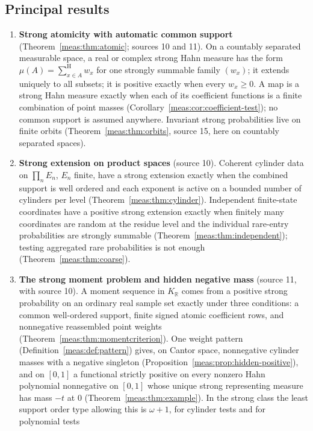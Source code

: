 \documentclass[11pt]{article}
\numberwithin{equation}{section}
\theoremstyle{definition}
\theoremstyle{remark}
\newcommand{\R}{\mathbb R}
\newcommand{\KR}{K_{\R}}
\newcommand{\hsum}{\mathop{\sum}\nolimits^{\mathrm H}}
\begin{document}
\subsection{Principal results}\label{meas:sub:results}

\begin{enumerate}[label=\textbf{\Alph*.},leftmargin=2em]
\item \textbf{Strong atomicity with automatic common support}
(Theorem~\ref{meas:thm:atomic}; sources 10 and 11). On a countably separated
measurable space, a real or complex strong Hahn measure has the form
$\mu(A)=\hsum_{x\in A}w_x$ for one strongly summable family $(w_x)$; it extends
uniquely to all subsets; it is positive exactly when every $w_x\ge0$. A map is a
strong Hahn measure exactly when each of its coefficient functions is a finite
combination of point masses (Corollary~\ref{meas:cor:coefficient-test}); no
common support is assumed anywhere. Invariant strong probabilities live on
finite orbits (Theorem~\ref{meas:thm:orbits}, source 15, here on countably
separated spaces).
\item \textbf{Strong extension on product spaces} (source 10). Coherent
cylinder data on $\prod_nE_n$, $E_n$ finite, have a strong extension exactly
when the combined support is well ordered and each exponent is active on a
bounded number of cylinders per level (Theorem~\ref{meas:thm:cylinder}).
Independent finite-state coordinates have a positive strong extension exactly
when finitely many coordinates are random at the residue level and the
individual rare-entry probabilities are strongly summable
(Theorem~\ref{meas:thm:independent}); testing aggregated rare probabilities is
not enough (Theorem~\ref{meas:thm:coarse}).
\item \textbf{The strong moment problem and hidden negative mass} (source 11,
with source 10). A moment sequence in $\KR$ comes from a positive strong
probability on an ordinary real sample set exactly under three conditions:
a common well-ordered support, finite signed atomic coefficient rows, and
nonnegative reassembled point weights (Theorem~\ref{meas:thm:momentcriterion}).
One weight pattern (Definition~\ref{meas:def:pattern}) gives, on Cantor space,
nonnegative cylinder masses with a negative singleton
(Proposition~\ref{meas:prop:hidden-positive}), and on $[0,1]$ a functional
strictly positive on every nonzero Hahn polynomial nonnegative on $[0,1]$
whose unique strong representing measure has mass $-t$ at $0$
(Theorem~\ref{meas:thm:example}). In the strong class the least support order
type allowing this is $\omega+1$, for cylinder tests and for polynomial tests

\end{enumerate}
\end{document}
